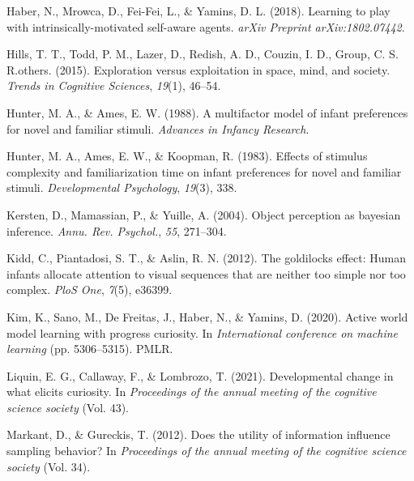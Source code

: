 \documentclass[10pt, letterpaper]{article}
\newenvironment{CSLReferences}%
  {}%
  {\par}
\begin{document}
\begin{CSLReferences}{1}{0}
\leavevmode{}%
Haber, N., Mrowca, D., Fei-Fei, L., \& Yamins, D. L. (2018). Learning to
play with intrinsically-motivated self-aware agents. \emph{arXiv
Preprint arXiv:1802.07442}.

\leavevmode{}%
Hills, T. T., Todd, P. M., Lazer, D., Redish, A. D., Couzin, I. D.,
Group, C. S. R.others. (2015). Exploration versus exploitation in space,
mind, and society. \emph{Trends in Cognitive Sciences}, \emph{19}(1),
46--54.

\leavevmode{}%
Hunter, M. A., \& Ames, E. W. (1988). A multifactor model of infant
preferences for novel and familiar stimuli. \emph{Advances in Infancy
Research}.

\leavevmode{}%
Hunter, M. A., Ames, E. W., \& Koopman, R. (1983). Effects of stimulus
complexity and familiarization time on infant preferences for novel and
familiar stimuli. \emph{Developmental Psychology}, \emph{19}(3), 338.

\leavevmode{}%
Kersten, D., Mamassian, P., \& Yuille, A. (2004). Object perception as
bayesian inference. \emph{Annu. Rev. Psychol.}, \emph{55}, 271--304.

\leavevmode{}%
Kidd, C., Piantadosi, S. T., \& Aslin, R. N. (2012). The goldilocks
effect: Human infants allocate attention to visual sequences that are
neither too simple nor too complex. \emph{PloS One}, \emph{7}(5),
e36399.

\leavevmode{}%
Kim, K., Sano, M., De Freitas, J., Haber, N., \& Yamins, D. (2020).
Active world model learning with progress curiosity. In
\emph{International conference on machine learning} (pp. 5306--5315).
PMLR.

\leavevmode{}%
Liquin, E. G., Callaway, F., \& Lombrozo, T. (2021). Developmental
change in what elicits curiosity. In \emph{Proceedings of the annual
meeting of the cognitive science society} (Vol. 43).

\leavevmode{}%
Markant, D., \& Gureckis, T. (2012). Does the utility of information
influence sampling behavior? In \emph{Proceedings of the annual meeting
of the cognitive science society} (Vol. 34).


\end{CSLReferences}
\end{document}
